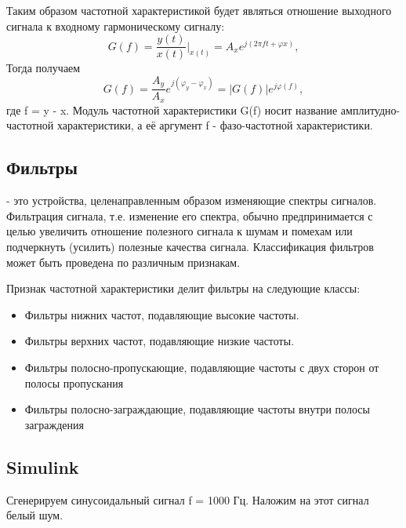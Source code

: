 \documentclass[a4paper,14pt]{extarticle}
\begin{document}
Таким образом частотной характеристикой будет являться отношение выходного сигнала к входному гармоническому сигналу:
\begin{equation*}
G(f) = \frac{y(t)}{x(t)}|_{x(t)}=A_x e^{j(2 \pi f t + \varphi x)} ,
\label{f3}
\end{equation*}
Тогда получаем
\begin{equation*}
G(f) = \frac{A_y}{A_x} e^{j(\varphi_y - \varphi_x)} = |G(f)|e^{j \varphi(f)} ,
\label{f3}
\end{equation*}
где f = y - x. Модуль частотной характеристики G(f) носит название амплитудно-частотной характеристики, а её аргумент f - фазо-частотной характеристики.

\subsection{Фильтры} - это устройства, целенаправленным образом изменяющие спектры сигналов. Фильтрация сигнала, т.е. изменение его спектра, обычно предпринимается с целью увеличить отношение полезного сигнала к шумам и помехам или подчеркнуть (усилить) полезные качества сигнала. Классификация фильтров может быть проведена по различным признакам. 

Признак частотной характеристики делит фильтры на следующие классы:

\begin{itemize}
\item Фильтры нижних частот, подавляющие высокие частоты.
\item Фильтры верхних частот, подавляющие низкие частоты.
\item Фильтры полосно-пропускающие, подавляющие частоты с двух сторон от полосы пропускания
\item Фильтры полосно-заграждающие, подавляющие частоты внутри полосы заграждения
\end{itemize}

\subsection{Simulink}

Сгенерируем синусоидальный сигнал f = 1000 Гц. Наложим на этот сигнал белый шум. 
\end{document}
